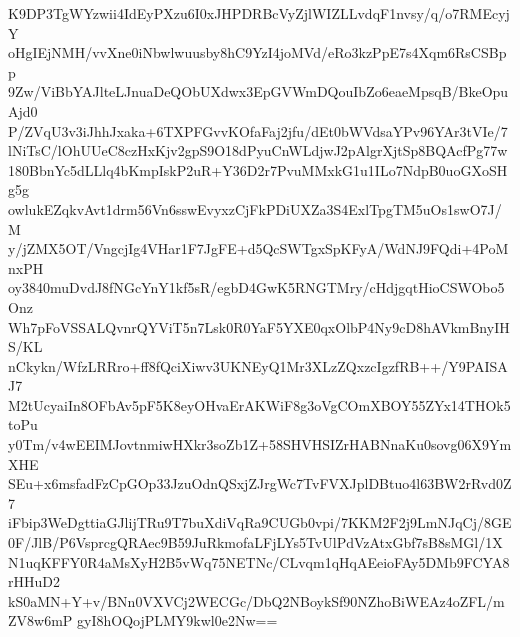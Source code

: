 K9DP3TgWYzwii4IdEyPXzu6I0xJHPDRBcVyZjlWIZLLvdqF1nvsy/q/o7RMEcyjY
oHgIEjNMH/vvXne0iNbwlwuusby8hC9YzI4joMVd/eRo3kzPpE7s4Xqm6RsCSBpp
9Zw/ViBbYAJlteLJnuaDeQObUXdwx3EpGVWmDQouIbZo6eaeMpsqB/BkeOpuAjd0
P/ZVqU3v3iJhhJxaka+6TXPFGvvKOfaFaj2jfu/dEt0bWVdsaYPv96YAr3tVIe/7
lNiTsC/lOhUUeC8czHxKjv2gpS9O18dPyuCnWLdjwJ2pAlgrXjtSp8BQAcfPg77w
180BbnYc5dLLlq4bKmpIskP2uR+Y36D2r7PvuMMxkG1u1ILo7NdpB0uoGXoSHg5g
owlukEZqkvAvt1drm56Vn6sswEvyxzCjFkPDiUXZa3S4ExlTpgTM5uOs1swO7J/M
y/jZMX5OT/VngcjIg4VHar1F7JgFE+d5QcSWTgxSpKFyA/WdNJ9FQdi+4PoMnxPH
oy3840muDvdJ8fNGcYnY1kf5sR/egbD4GwK5RNGTMry/cHdjgqtHioCSWObo5Onz
Wh7pFoVSSALQvnrQYViT5n7Lsk0R0YaF5YXE0qxOlbP4Ny9cD8hAVkmBnyIHS/KL
nCkykn/WfzLRRro+ff8fQciXiwv3UKNEyQ1Mr3XLzZQxzcIgzfRB++/Y9PAISAJ7
M2tUcyaiIn8OFbAv5pF5K8eyOHvaErAKWiF8g3oVgCOmXBOY55ZYx14THOk5toPu
y0Tm/v4wEEIMJovtnmiwHXkr3soZb1Z+58SHVHSIZrHABNnaKu0sovg06X9YmXHE
SEu+x6msfadFzCpGOp33JzuOdnQSxjZJrgWc7TvFVXJplDBtuo4l63BW2rRvd0Z7
iFbip3WeDgttiaGJlijTRu9T7buXdiVqRa9CUGb0vpi/7KKM2F2j9LmNJqCj/8GE
0F/JlB/P6VsprcgQRAec9B59JuRkmofaLFjLYs5TvUlPdVzAtxGbf7sB8sMGl/1X
N1uqKFFY0R4aMsXyH2B5vWq75NETNc/CLvqm1qHqAEeioFAy5DMb9FCYA8rHHuD2
kS0aMN+Y+v/BNn0VXVCj2WECGc/DbQ2NBoykSf90NZhoBiWEAz4oZFL/mZV8w6mP
gyI8hOQojPLMY9kwl0e2Nw==
